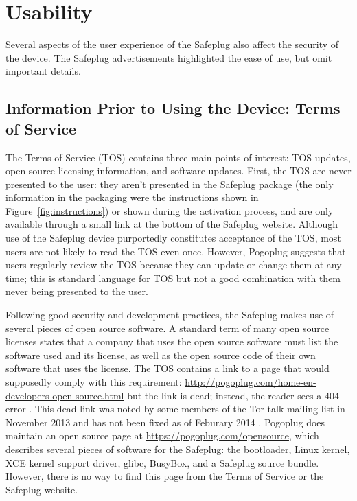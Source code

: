 \documentclass[conference]{IEEEtran}
\begin{document}
\section{Usability}
Several aspects of the user experience of the Safeplug also affect the security of the device.  The Safeplug advertisements highlighted the ease of use, but omit important details.

\subsection{Information Prior to Using the Device: Terms of Service}
\label{tos}
The Terms of Service (TOS) contains three main points of interest: TOS updates, open source licensing information, and software updates.  First, the TOS are never presented to the user: they aren't presented in the Safeplug package (the only information in the packaging were the instructions shown in Figure~\ref{fig:instructions}) or shown during the activation process, and are only available through a small link at the bottom of the Safeplug website\cite{safeplug}.  Although use of the Safeplug device purportedly constitutes acceptance of the TOS, most users are not likely to read the TOS even once.  However, Pogoplug suggests that users regularly review the TOS because they can update or change them at any time; this is standard language for TOS but not a good combination with them never being presented to the user.

Following good security and development practices, the Safeplug makes use of several pieces of open source software.  A standard term of many open source licenses states that a company that uses the open source software must list the software used and its license, as well as the open source code of their own software that uses the license.  The TOS contains a link to a page that would supposedly comply with this requirement: \url{http://pogoplug.com/home-en-developers-open-source.html} but the link is dead; instead, the reader sees a 404 error \cite{safeplug}.  This dead link was noted by some members of the Tor-talk mailing list in November 2013 and has not been fixed as of Feburary 2014 \cite{tormailinglist}.  Pogoplug does maintain an open source page at \url{https://pogoplug.com/opensource}, which describes several pieces of software for the Safeplug: the bootloader, Linux kernel, XCE kernel support driver, glibc, BusyBox, and a Safeplug source bundle.  However, there is no way to find this page from the Terms of Service or the Safeplug website.
\end{document}
